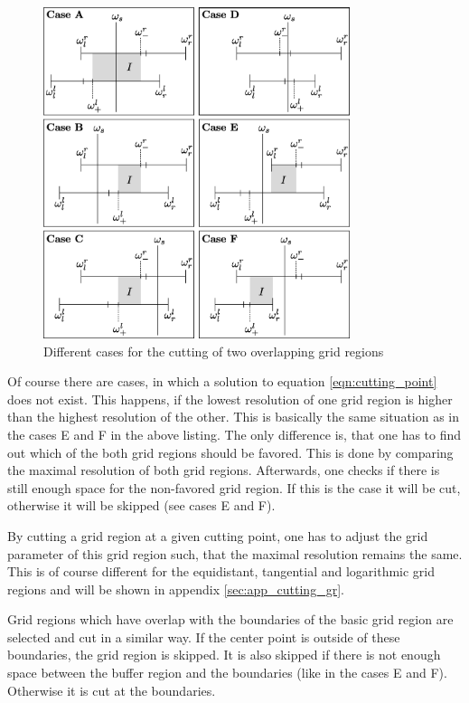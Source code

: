 \begin{figure}[h]
	\centering
	\includegraphics[width=0.8\textwidth]{pics/cutting_gr_cases.eps}
	\caption{Different cases for the cutting of two overlapping grid regions}
	\label{fig:cutting_gr_cases}
\end{figure}

Of course there are cases, in which a solution to equation \ref{eqn:cutting_point} does not exist. This happens, if the lowest resolution of one grid region is higher than the highest resolution of the other. This is basically the same situation as in the cases E and F in the above listing. The only difference is, that one has to find out which of the both grid regions should be favored. This is done by comparing the maximal resolution of both grid regions. Afterwards, one checks if there is still enough space for the non-favored grid region. If this is the case it will be cut, otherwise it will be skipped  (see cases E and F).

By cutting a grid region at a given cutting point, one has to adjust the grid parameter of this grid region such, that the maximal resolution remains the same. This is of course different for the equidistant, tangential and logarithmic grid regions and will be shown in appendix \ref{sec:app_cutting_gr}.

Grid regions which have overlap with the boundaries of the basic grid region are selected and cut in a similar way. If the center point is outside of these boundaries, the grid region is skipped. It is also skipped if there is not enough space between the buffer region and the boundaries (like in the cases E and F). Otherwise it is cut at the boundaries.

